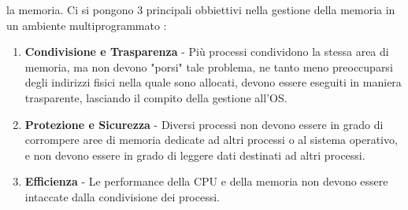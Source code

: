 \documentclass[12pt, letterpaper]{article}
\begin{document}
la memoria. Ci si pongono 3 principali obbiettivi nella gestione della memoria in un ambiente multiprogrammato : \begin{enumerate}
    \item \textbf{Condivisione e Trasparenza} - Più processi condividono la stessa area di memoria, ma non devono 
    "porsi" tale problema, ne tanto meno preoccuparsi degli indirizzi fisici nella quale sono allocati, devono essere eseguiti 
    in maniera trasparente, lasciando il compito della gestione all'OS.
    \item \textbf{Protezione e Sicurezza} - Diversi processi non devono essere in grado di corrompere aree di memoria dedicate 
    ad altri processi o al sistema operativo, e non devono essere in grado di leggere dati destinati ad altri processi.
    \item \textbf{Efficienza} - Le performance della CPU e della memoria non devono essere intaccate dalla condivisione dei processi. 
\end{enumerate}
\end{document}
